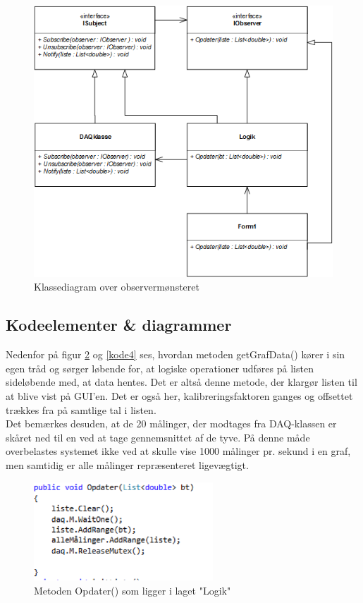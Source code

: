 \begin{figure}[H]
	\centering
	\includegraphics[width=1\textwidth]{Figurer/SoftwareImplementering/observer}
	\caption{Klassediagram over observermønsteret}
	\label{observerklasse}
\end{figure}

\newpage
\subsection{Kodeelementer \& diagrammer}
Nedenfor på figur \ref{kode3} og \ref{kode4} ses, hvordan metoden getGrafData() kører i sin egen tråd og sørger løbende for, at logiske operationer udføres på listen sideløbende med, at data hentes. Det er altså denne metode, der klargør listen til at blive vist på GUI’en. Det er også her, kalibreringsfaktoren ganges og offsettet trækkes fra på samtlige tal i listen.\\ 
Det bemærkes desuden, at de 20 målinger, der modtages fra DAQ-klassen er skåret ned til en ved at tage gennemsnittet af de tyve. På denne måde overbelastes systemet ikke ved at skulle vise 1000 målinger pr. sekund i en graf, men samtidig er alle målinger repræsenteret ligevægtigt.
\begin{figure}[H]
	\includegraphics[width=0.6\textwidth]{Figurer/Jeppe/5}
	\caption{Metoden Opdater() som ligger i laget "Logik"}
	\label{kode3}
\end{figure}

